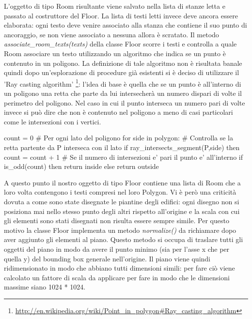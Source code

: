 \documentclass[12pt]{report}
\begin{document}
L'oggetto di tipo Room risultante viene salvato nella lista di stanze letta e passato al costruttore del Floor. La lista di testi letti invece deve ancora essere elaborata: ogni testo deve venire associato alla stanza che contiene il suo punto di ancoraggio, se non viene associato a nessuna allora è scratato.
Il metodo \textit{associate\_room\_texts(texts)} della classe Floor scorre i testi e controlla a quale Room associare un testo utilizzando un algoritmo che indica se un punto è contenuto in un poligono. 
La definizione di tale algoritmo non è risultata banale quindi dopo un'esplorazione di procedure già esistenti si è deciso di utilizzare il 'Ray casting algorithm' \footnote{\url{http://en.wikipedia.org/wiki/Point\_in\_polygon\#Ray\_casting\_algorithm}}: l'idea di base è quella che se un punto è all'interno di un poligono una retta che parte da lui intersecherà un numero dispari di volte il perimetro del poligono. Nel caso in cui il punto interseca un numero pari di volte invece si può dire che non è contenuto nel poligono a meno di casi particolari come le intersezioni con i vertici.

\begin{python}[title=Ray casting algorithm in pseudocodice, frame=single]
count = 0
# Per ogni lato del poligono
for side in polygon:
# Controlla se la retta partente da P interseca con il lato
    if ray_intersects_segment(P,side) then
        count = count + 1
# Se il numero di intersezioni e' pari il punto e' all'interno
if is_odd(count) then    
    return inside
else
    return outside
\end{python}

\vspace{5mm} %

A questo punto il nostro oggetto di tipo Floor contiene una lista di Room che a loro volta contengono i testi compresi nel loro Polygon. 
Vi è però una criticità dovuta a come sono state disegnate le piantine degli edifici: ogni disegno non si posiziona mai nello stesso punto degli altri rispetto all'origine e la scala con cui gli elementi sono stati disegnati non risulta essere sempre simile. 
Per questo motivo la classe Floor implementa un metodo \textit{normalize()} da richiamare dopo aver aggiunto gli elementi al piano. 
Questo metodo si occupa di traslare tutti gli oggetti del piano in modo da avere il punto minimo (sia per l'asse x che per quella y) del bounding box generale nell'origine. 
Il piano viene quindi ridimensionato in modo che abbiano tutti dimensioni simili: per fare ciò viene calcolato un fattore di scala da applicare per fare in modo che le dimensioni massime siano 1024 * 1024.
\end{document}
